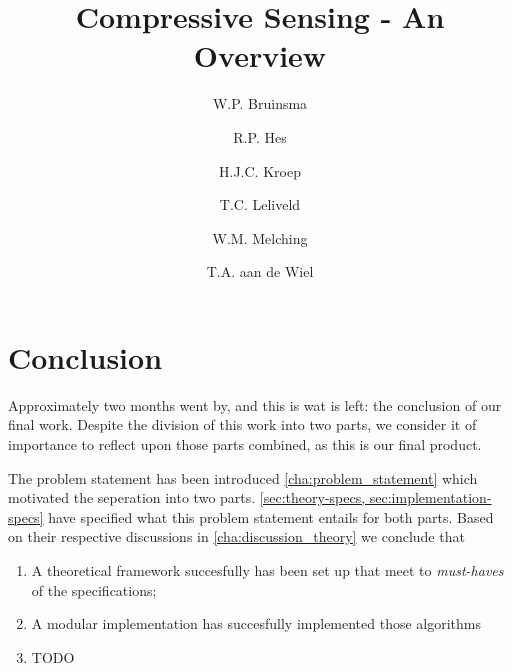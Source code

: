 \documentclass[a4paper, openany, oneside]{memoir}
\title{Compressive Sensing - An Overview}
\author{W.P. Bruinsma \and R.P. Hes \and H.J.C. Kroep \and T.C. Leliveld \and W.M. Melching \and T.A. aan de Wiel}
\begin{document}
\chapter{Conclusion}


Approximately two months went by, and this is wat is left: the conclusion of our final work. Despite the division of this work into two parts, we consider it of importance to reflect upon those parts combined, as this is our final product. 

The problem statement has been introduced \cref{cha:problem_statement} which motivated the seperation into two parts. \cref{sec:theory-specs, sec:implementation-specs} have specified what this problem statement entails for both parts. Based on their respective discussions in \cref{cha:discussion_theory} we conclude that

\begin{enumerate}
	\item A theoretical framework succesfully has been set up that meet to \emph{must-haves} of the specifications;
	\item A modular implementation has succesfully implemented those algorithms
	\item TODO
\end{enumerate} 
\end{document}
